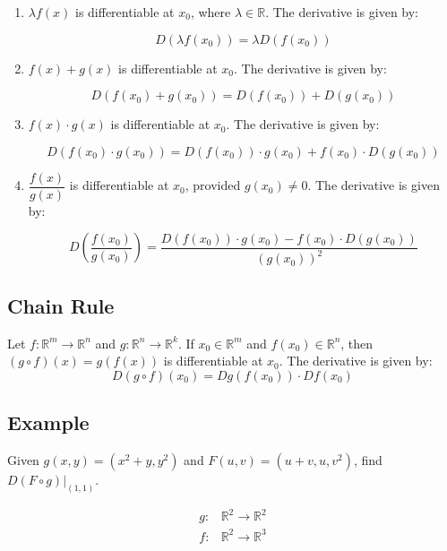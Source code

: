 \documentclass[11pt]{article}
\begin{document}
\begin{enumerate}
    \item \( \lambda f(x) \) is differentiable at \( x_0 \), where \( \lambda \in \mathbb{R} \). The derivative is given by:
    
    \[
    D(\lambda f(x_0)) = \lambda D(f(x_0))
    \]

    \item \( f(x) + g(x) \) is differentiable at \( x_0 \). The derivative is given by:

    \[
    D(f(x_0) + g(x_0)) = D(f(x_0)) + D(g(x_0))
    \]

    \item \( f(x) \cdot g(x) \) is differentiable at \( x_0 \). The derivative is given by:
    
    \[
    D(f(x_0) \cdot g(x_0)) = D(f(x_0)) \cdot g(x_0) + f(x_0) \cdot D(g(x_0))
    \]

    \item \( \dfrac{f(x)}{g(x)} \) is differentiable at \( x_0 \), provided \( g(x_0) \neq 0 \). The derivative is given by:
    
    \[
    D\left( \frac{f(x_0)}{g(x_0)} \right) = \frac{D(f(x_0)) \cdot g(x_0) - f(x_0) \cdot D(g(x_0))}{(g(x_0))^2}
    \]

\end{enumerate}

\subsection{Chain Rule}

Let \( f : \mathbb{R}^m \rightarrow \mathbb{R}^n \) and \( g : \mathbb{R}^n \rightarrow \mathbb{R}^k \). If \( x_0 \in \mathbb{R}^m \) and \( f(x_0) \in \mathbb{R}^n \), then \( (g \circ f)(x) = g(f(x)) \) is differentiable at \( x_0 \). The derivative is given by:
\[
D(g \circ f)(x_0) = Dg(f(x_0)) \cdot Df(x_0)
\]

\subsection*{Example}
Given \( g(x, y) = (x^2 + y, y^2) \) and \( F(u, v) = (u + v, u, v^2) \), find \( D(F \circ g)\big|_{(1, 1)} \).

\begin{align*}
g : & \mathbb{R}^2 \rightarrow \mathbb{R}^2 \\
f : & \mathbb{R}^2 \rightarrow \mathbb{R}^3
\end{align*}
\end{document}

